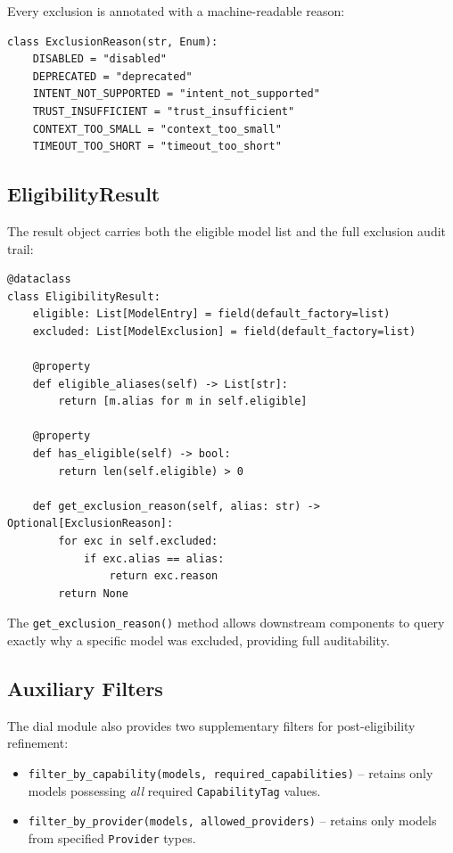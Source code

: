 \documentclass[11pt,a4paper]{article}
\theoremstyle{plain}
\theoremstyle{definition}
\begin{document}
Every exclusion is annotated with a machine-readable reason:

\begin{lstlisting}[style=pythonstyle, caption={ExclusionReason enum from \texttt{dial.py}}]
class ExclusionReason(str, Enum):
    DISABLED = "disabled"
    DEPRECATED = "deprecated"
    INTENT_NOT_SUPPORTED = "intent_not_supported"
    TRUST_INSUFFICIENT = "trust_insufficient"
    CONTEXT_TOO_SMALL = "context_too_small"
    TIMEOUT_TOO_SHORT = "timeout_too_short"
\end{lstlisting}

\subsection{EligibilityResult}

The result object carries both the eligible model list and the full exclusion
audit trail:

\begin{lstlisting}[style=pythonstyle, caption={EligibilityResult from \texttt{dial.py}}]
@dataclass
class EligibilityResult:
    eligible: List[ModelEntry] = field(default_factory=list)
    excluded: List[ModelExclusion] = field(default_factory=list)

    @property
    def eligible_aliases(self) -> List[str]:
        return [m.alias for m in self.eligible]

    @property
    def has_eligible(self) -> bool:
        return len(self.eligible) > 0

    def get_exclusion_reason(self, alias: str) -> Optional[ExclusionReason]:
        for exc in self.excluded:
            if exc.alias == alias:
                return exc.reason
        return None
\end{lstlisting}

The \texttt{get\_exclusion\_reason()} method allows downstream components to
query exactly why a specific model was excluded, providing full auditability.

\subsection{Auxiliary Filters}

The dial module also provides two supplementary filters for post-eligibility
refinement:

\begin{itemize}[leftmargin=2em]
\item \texttt{filter\_by\_capability(models, required\_capabilities)} -- retains
  only models possessing \emph{all} required \texttt{CapabilityTag} values.
\item \texttt{filter\_by\_provider(models, allowed\_providers)} -- retains only
  models from specified \texttt{Provider} types.
\end{itemize}
\end{document}

